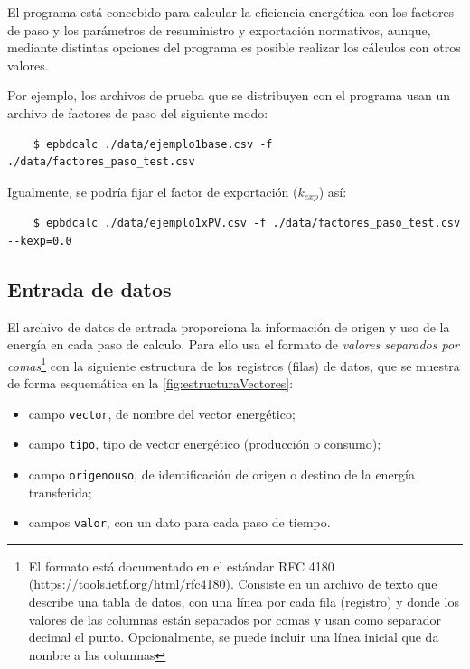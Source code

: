 \documentclass[10pt,notitlepage,oneside,a4paper]{article}
\begin{document}
El programa está concebido para calcular la eficiencia energética con los factores de paso y los parámetros de resuministro y exportación normativos, aunque, mediante distintas opciones del programa es posible realizar los cálculos con otros valores.

Por ejemplo, los archivos de prueba que se distribuyen con el programa usan un archivo de factores de paso del siguiente modo:

\begin{Verbatim}
	$ epbdcalc ./data/ejemplo1base.csv -f ./data/factores_paso_test.csv 
\end{Verbatim}

Igualmente, se podría fijar el factor de exportación ($k_{exp}$) así:

\begin{Verbatim}
	$ epbdcalc ./data/ejemplo1xPV.csv -f ./data/factores_paso_test.csv --kexp=0.0
\end{Verbatim}

\subsection{Entrada de datos}

El archivo de datos de entrada proporciona la información de origen y uso de la energía en cada paso de calculo. Para ello usa el formato de \textit{valores separados por comas}\footnote{El formato está documentado en el estándar RFC 4180 (\url{https://tools.ietf.org/html/rfc4180}). Consiste en un archivo de texto que describe una tabla de datos, con una línea por cada fila (registro) y donde los valores de las columnas están separados por comas y usan como separador decimal el punto. Opcionalmente, se puede incluir una línea inicial que da nombre a las columnas} con la siguiente estructura de los registros (filas) de datos, que se muestra de forma esquemática en la \autoref{fig:estructuraVectores}:

\begin{itemize}
\item campo \texttt{vector}, de nombre del vector energético;
\item campo \texttt{tipo}, tipo de vector energético (producción o consumo);
\item campo \texttt{origenouso}, de identificación de origen o destino de la energía transferida;
\item campos \texttt{valor}, con un dato para cada paso de tiempo.
\end{itemize}
\end{document}
